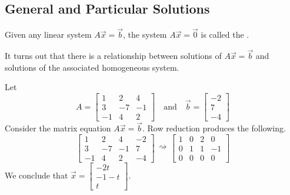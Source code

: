 \documentclass{ximera}
\begin{document}
\subsection*{General and Particular Solutions}

\begin{definition}\label{def:asshomsys} Given any linear system $A\vec{x}=\vec{b}$, the system $A\vec{x}=\vec{0}$ is called the .
\end{definition}

It turns out that there is a relationship between solutions of $A\vec{x}=\vec{b}$ and solutions of the associated homogeneous system.

\begin{exploration}\label{init:generalplusparticular}
Let $$A=\begin{bmatrix}1&2&4\\3&-7&-1\\-1&4&2\end{bmatrix}\quad\text{and}\quad\vec{b}=\begin{bmatrix}-2\\7\\-4\end{bmatrix}$$
Consider the matrix equation $A\vec{x}=\vec{b}$.  Row reduction produces the following.
$$\left[\begin{array}{ccc|c}  
 1&2&4&-2\\3&-7&-1&7\\-1&4&2&-4
 \end{array}\right]\begin{array}{c}
 \\
 \rightsquigarrow\\
 \\
 \end{array}\left[\begin{array}{ccc|c}  
 1&0&2&0\\0&1&1&-1\\0&0&0&0
 \end{array}\right]$$
 We conclude that $\vec{x}=\begin{bmatrix}-2t\\-1-t\\t\end{bmatrix}$.  
 

\end{exploration}
\end{document}
